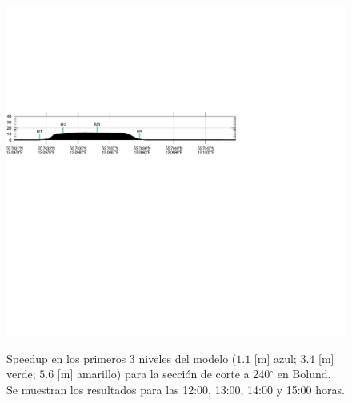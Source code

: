 \begin{figure}[H]
	\includegraphics[width=0.95\linewidth,trim={-11mm 193mm 115mm 112mm},clip]{Imagenes/06/bol/cross_height}\\%
	\caption{Speedup en los primeros 3 niveles del modelo ($1.1$ [m] azul; $3.4$ [m] verde; $5.6$ [m] amarillo) para la sección de corte a 240$^\circ$ en Bolund. Se muestran los resultados para las 12:00, 13:00, 14:00 y 15:00 horas.}
	\label{fig:06_bol_speedup}
\end{figure}

